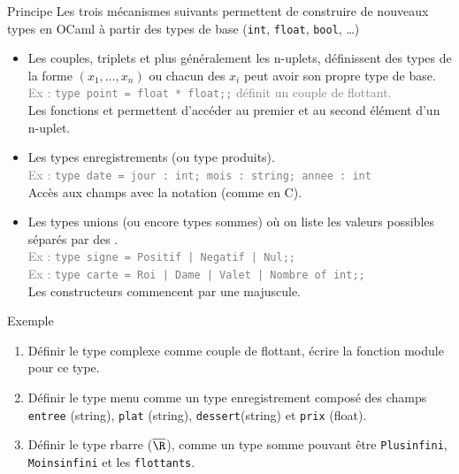 \documentclass[10pt]{beamer}
\begin{document}
\begin{frame}{\Ctitle}{\stitle}
	\begin{block}{Principe}
		Les trois mécanismes suivants permettent de construire de nouveaux types en OCaml à partir des types de base ({\tt int}, {\tt float}, {\tt bool}, \dots)
		\begin{itemize}
			\item<2-> Les couples, triplets et plus généralement les n-uplets, définissent des types de la forme $(x_1,\dots,x_n)$ ou chacun des $x_i$ peut avoir son propre type de base. \\
				\onslide<3->\textcolor{gray}{Ex : \texttt{type point = float * float;;} définit un couple de flottant.}\\
				\onslide<4->Les fonctions  et  permettent d'accéder au premier et au second élément d'un n-uplet.
			\item<5-> Les types enregistrements (ou type produits).\\
				\onslide<6->\textcolor{gray}{Ex : \texttt{type date = {jour : int; mois : string; annee : int}}}\\
				\onslide<7-> Accès aux champs avec la notation  (comme en C).
			\item<8-> Les types unions (ou encore types sommes) où on liste les valeurs possibles séparés par des \kw{|}. \\
				\onslide<9->\textcolor{gray}{Ex : \texttt{type signe = Positif | Negatif | Nul;;}}\\
				\onslide<10->\textcolor{gray}{Ex : \texttt{type carte = Roi | Dame | Valet | Nombre of int;;}}\\
				\onslide<11->\textcolor{BrickRed}{\small \danger \;} Les constructeurs commencent par une majuscule.
		\end{itemize}
	\end{block}
\end{frame}

\begin{frame}{\Ctitle}{\stitle}
	\begin{exampleblock}{Exemple}
		\begin{enumerate}
			\item<1-> Définir le type complexe comme couple de flottant, écrire la fonction module pour ce type.
			\item<2-> Définir le type menu comme un type enregistrement composé des champs {\tt entree} (string), {\tt plat} (string), {\tt dessert}(string) et {\tt prix} (float).
			\item<3-> Définir le type rbarre ($\overline{\R}$), comme un type somme pouvant être {\tt Plusinfini}, {\tt Moinsinfini} et les {\tt flottants}.
		\end{enumerate}
	\end{exampleblock}
\end{frame}
\end{document}
